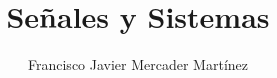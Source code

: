 
\title{Señales y Sistemas}
\author{Francisco Javier Mercader Martínez}
\date{}


\maketitle

\thispagestyle{empty}

\tableofcontents

\thispagestyle{empty}

\newpage

\setcounter{page}{1}


